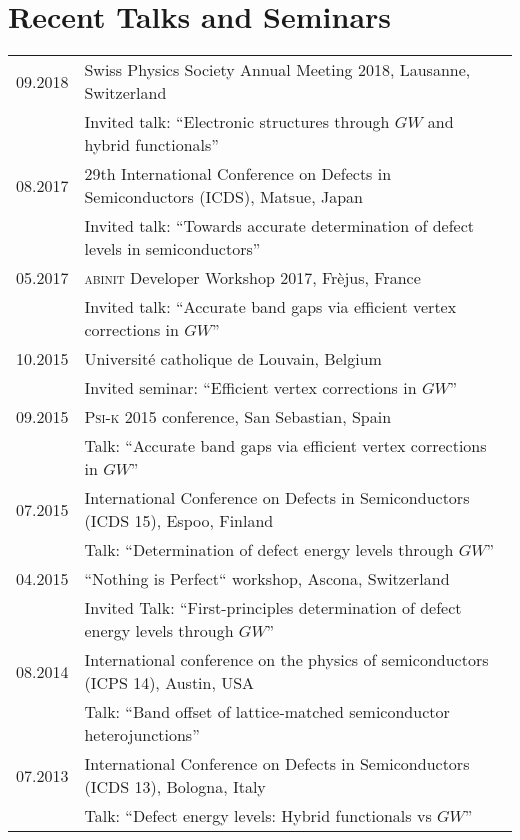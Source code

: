 \documentclass[a4paper, 11pt, DIV=15,headings=normal]{scrartcl}
\begin{document}
\section*{Recent Talks and Seminars}
\begin{tabular}{ll}
09.2018         & Swiss Physics Society Annual Meeting 2018, Lausanne, Switzerland \\
                & Invited talk: ``Electronic structures through $GW$ and hybrid functionals''\\
08.2017         & 29th International Conference on Defects in Semiconductors (ICDS), Matsue, Japan  \\
                & Invited talk: ``Towards accurate determination of defect levels in semiconductors'' \\
05.2017         & \textsc{abinit} Developer Workshop 2017, Fr\`{e}jus, France \\
                & Invited talk: ``Accurate band gaps via efficient vertex corrections in $GW$''\\
10.2015         & Universit\'{e} catholique de Louvain, Belgium \\
                & Invited seminar: ``Efficient vertex corrections in $GW$'' \\
09.2015         & \textsc{Psi-k} 2015 conference, San Sebastian, Spain \\
                & Talk: ``Accurate band gaps via efficient vertex corrections in $GW$'' \\
07.2015         & International Conference on Defects in Semiconductors (ICDS 15), Espoo, Finland \\
                & Talk: ``Determination of defect energy levels through $GW$''\\
04.2015         & ``Nothing is Perfect`` workshop, Ascona, Switzerland \\
                & Invited Talk: ``First-principles determination of defect energy levels through $GW$'' \\
08.2014         & International conference on the physics of semiconductors (ICPS 14), Austin, USA \\
                & Talk: ``Band offset of lattice-matched semiconductor heterojunctions'' \\
07.2013         & International Conference on Defects in Semiconductors (ICDS 13), Bologna, Italy \\
                & Talk: ``Defect energy levels: Hybrid functionals vs $GW$'' \\
\end{tabular}
\end{document}
